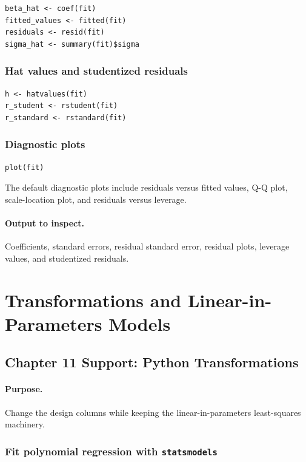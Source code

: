 \begin{verbatim}
beta_hat <- coef(fit)
fitted_values <- fitted(fit)
residuals <- resid(fit)
sigma_hat <- summary(fit)$sigma
\end{verbatim}

\subsubsection*{Hat values and studentized residuals}

\begin{verbatim}
h <- hatvalues(fit)
r_student <- rstudent(fit)
r_standard <- rstandard(fit)
\end{verbatim}

\subsubsection*{Diagnostic plots}

\begin{verbatim}
plot(fit)
\end{verbatim}

The default diagnostic plots include residuals versus fitted values, Q-Q plot, scale-location plot, and residuals versus leverage.

\paragraph{Output to inspect.} Coefficients, standard errors, residual standard error, residual plots, leverage values, and studentized residuals.

\section{Transformations and Linear-in-Parameters Models}
\label{app:cookbook-transformations-linear-in-parameters}

\subsection{Chapter 11 Support: Python Transformations}
\label{app:ch11-software-cookbook-python}

\paragraph{Purpose.} Change the design columns while keeping the linear-in-parameters least-squares machinery.

\subsubsection*{Fit polynomial regression with \texttt{statsmodels}}

